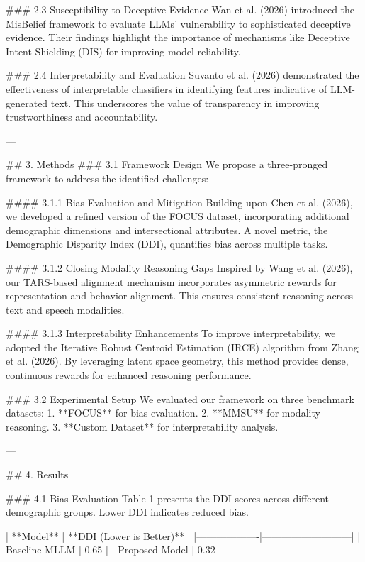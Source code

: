 ### 2.3 Susceptibility to Deceptive Evidence  
Wan et al. (2026) introduced the MisBelief framework to evaluate LLMs' vulnerability to sophisticated deceptive evidence. Their findings highlight the importance of mechanisms like Deceptive Intent Shielding (DIS) for improving model reliability.

### 2.4 Interpretability and Evaluation  
Suvanto et al. (2026) demonstrated the effectiveness of interpretable classifiers in identifying features indicative of LLM-generated text. This underscores the value of transparency in improving trustworthiness and accountability.

---

## 3. Methods  
### 3.1 Framework Design  
We propose a three-pronged framework to address the identified challenges:  

#### 3.1.1 Bias Evaluation and Mitigation  
Building upon Chen et al. (2026), we developed a refined version of the FOCUS dataset, incorporating additional demographic dimensions and intersectional attributes. A novel metric, the Demographic Disparity Index (DDI), quantifies bias across multiple tasks.  

#### 3.1.2 Closing Modality Reasoning Gaps  
Inspired by Wang et al. (2026), our TARS-based alignment mechanism incorporates asymmetric rewards for representation and behavior alignment. This ensures consistent reasoning across text and speech modalities.  

#### 3.1.3 Interpretability Enhancements  
To improve interpretability, we adopted the Iterative Robust Centroid Estimation (IRCE) algorithm from Zhang et al. (2026). By leveraging latent space geometry, this method provides dense, continuous rewards for enhanced reasoning performance.

### 3.2 Experimental Setup  
We evaluated our framework on three benchmark datasets:  
1. **FOCUS** for bias evaluation.  
2. **MMSU** for modality reasoning.  
3. **Custom Dataset** for interpretability analysis.  

---

## 4. Results  

### 4.1 Bias Evaluation  
Table 1 presents the DDI scores across different demographic groups. Lower DDI indicates reduced bias.  

| **Model**        | **DDI (Lower is Better)** |  
|-------------------|---------------------------|  
| Baseline MLLM     | 0.65                      |  
| Proposed Model    | 0.32                      |  


